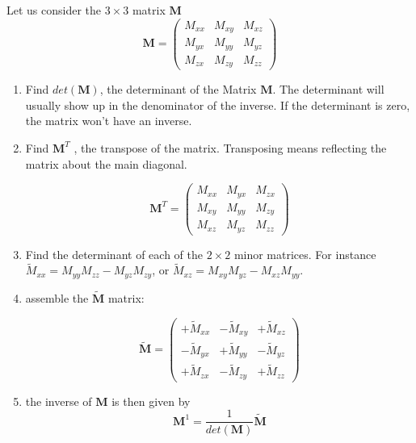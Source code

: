 Let us consider the $3 \times 3$ matrix ${\bm M}$
\[
{\bm M}=
\left(
\begin{array}{ccc}
M_{xx} & M_{xy} & M_{xz} \\
M_{yx} & M_{yy} & M_{yz} \\
M_{zx} & M_{zy} & M_{zz} 
\end{array}
\right)
\]

\begin{enumerate}
\item
Find $det({\bm M})$, the determinant of the Matrix ${\bm M}$.
The determinant will usually show up in the denominator of the inverse. 
If the determinant is zero, the matrix won't have an inverse.

\item  Find ${\bm M}^T$ , the transpose of the matrix. Transposing means reflecting 
the matrix about the main diagonal.

\[
{\bm M}^T=
\left(
\begin{array}{ccc}
M_{xx} & M_{yx} & M_{zx} \\
M_{xy} & M_{yy} & M_{zy} \\
M_{xz} & M_{yz} & M_{zz} 
\end{array}
\right)
\]

\item  Find the determinant of each of the $2\times2$ 
minor matrices. For instance $\tilde{M}_{xx}=M_{yy}M_{zz}-M_{yz}M_{zy}$,
or $\tilde{M}_{xz}=M_{xy}M_{yz}- M_{xz}M_{yy}$.

\item assemble the $\tilde{\bm M}$ matrix:

\[
\tilde{\bm M}=
\left(
\begin{array}{ccc}
+\tilde{M}_{xx} & -\tilde{M}_{xy} & +\tilde{M}_{xz} \\
-\tilde{M}_{yx} & +\tilde{M}_{yy} & -\tilde{M}_{yz} \\
+\tilde{M}_{zx} & -\tilde{M}_{zy} & +\tilde{M}_{zz} 
\end{array}
\right)
\]

\item the inverse of ${\bm M}$ is then given by
\[
{\bm M}^{1} = \frac{1}{det({\bm M})} \tilde{\bm M}
\]

\end{enumerate}

